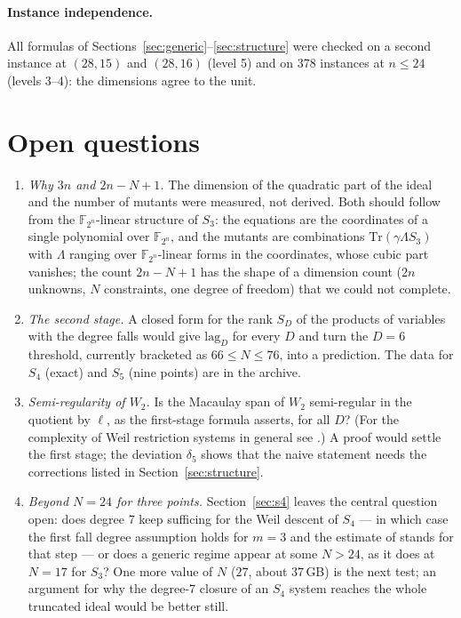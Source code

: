 \documentclass[11pt,a4paper]{article}
\theoremstyle{remark}\newtheorem{remark}{Remark}
\newcommand{\F}{\mathbb{F}}
\newcommand{\Tr}{\mathrm{Tr}}
\begin{document}
\paragraph{Instance independence.} All formulas of Sections~\ref{sec:generic}--\ref{sec:structure} were checked on a second instance at $(28,15)$ and $(28,16)$ (level 5) and on 378 instances at $n\le24$ (levels 3--4): the dimensions agree to the unit.

\section{Open questions}\label{sec:open}

\begin{enumerate}
\item \emph{Why $3n$ and $2n-N+1$.} The dimension of the quadratic part of the ideal and the number of mutants were measured, not derived. Both should follow from the $\F_{2^n}$-linear structure of $S_3$: the equations are the coordinates of a single polynomial over $\F_{2^n}$, and the mutants are combinations $\Tr(\gamma\Lambda S_3)$ with $\Lambda$ ranging over $\F_{2^n}$-linear forms in the coordinates, whose cubic part vanishes; the count $2n-N+1$ has the shape of a dimension count ($2n$ unknowns, $N$ constraints, one degree of freedom) that we could not complete.
\item \emph{The second stage.} A closed form for the rank $S_D$ of the products of variables with the degree falls would give $\mathrm{lag}_D$ for every $D$ and turn the $D=6$ threshold, currently bracketed as $66\le N\le76$, into a prediction. The data for $S_4$ (exact) and $S_5$ (nine points) are in the archive.
\item \emph{Semi-regularity of $W_2$.} Is the Macaulay span of $W_2$ semi-regular in the quotient by $\ell$, as the first-stage formula asserts, for all $D$? (For the complexity of Weil restriction systems in general see \cite{HKYY18,CCG23}.) A proof would settle the first stage; the deviation $\delta_5$ shows that the naive statement needs the corrections listed in Section~\ref{sec:structure}.
\item \emph{Beyond $N=24$ for three points.} Section~\ref{sec:s4} leaves the central question open: does degree 7 keep sufficing for the Weil descent of $S_4$ --- in which case the first fall degree assumption holds for $m=3$ and the estimate of \cite{PQ12} stands for that step --- or does a generic regime appear at some $N>24$, as it does at $N=17$ for $S_3$? One more value of $N$ ($27$, about $37$\,GB) is the next test; an argument for why the degree-7 closure of an $S_4$ system reaches the whole truncated ideal would be better still.
\end{enumerate}
\end{document}
